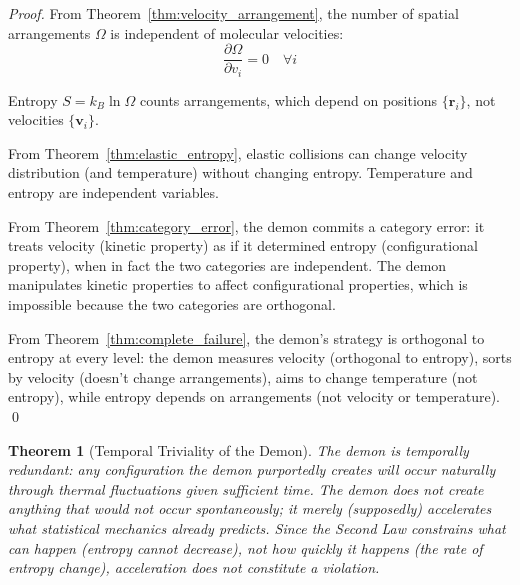 \documentclass[12pt,a4paper]{article}
\newtheorem{theorem}{Theorem}[section]
\theoremstyle{definition}
\theoremstyle{remark}
\begin{document}
\begin{proof}
From Theorem~\ref{thm:velocity_arrangement}, the number of spatial arrangements $\Omega$ is independent of molecular velocities:
\begin{equation}
\frac{\partial \Omega}{\partial v_i} = 0 \quad \forall i
\end{equation}

Entropy $S = k_B \ln \Omega$ counts arrangements, which depend on positions $\{\mathbf{r}_i\}$, not velocities $\{\mathbf{v}_i\}$.

From Theorem~\ref{thm:elastic_entropy}, elastic collisions can change velocity distribution (and temperature) without changing entropy. Temperature and entropy are independent variables.

From Theorem~\ref{thm:category_error}, the demon commits a category error: it treats velocity (kinetic property) as if it determined entropy (configurational property), when in fact the two categories are independent. The demon manipulates kinetic properties to affect configurational properties, which is impossible because the two categories are orthogonal.

From Theorem~\ref{thm:complete_failure}, the demon's strategy is orthogonal to entropy at every level: the demon measures velocity (orthogonal to entropy), sorts by velocity (doesn't change arrangements), aims to change temperature (not entropy), while entropy depends on arrangements (not velocity or temperature). \qed
\end{proof}

\begin{theorem}[Temporal Triviality of the Demon]
\label{thm:temporal_triviality}
The demon is temporally redundant: any configuration the demon purportedly creates will occur naturally through thermal fluctuations given sufficient time. The demon does not create anything that would not occur spontaneously; it merely (supposedly) accelerates what statistical mechanics already predicts. Since the Second Law constrains what can happen (entropy cannot decrease), not how quickly it happens (the rate of entropy change), acceleration does not constitute a violation.
\end{theorem}
\end{document}
